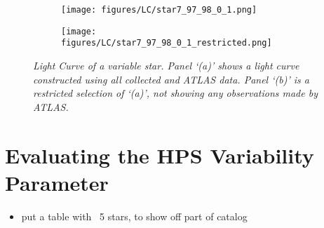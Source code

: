 \documentclass[aps,prb,twocolumn,superscriptaddress]{revtex4-1}
\begin{document}
\begin{figure*}
	\centering
	\begin{subfigure}{.5\textwidth}
	  \centering
	  \texttt{[image: figures/LC/star7\_97\_98\_0\_1.png]}
		\caption{\it \small{ }}
		\label{fig:LC7}
	\end{subfigure}%
	\begin{subfigure}{.5\textwidth}
	  \centering
			\texttt{[image: figures/LC/star7\_97\_98\_0\_1\_restricted.png]}
		\caption{\it \small{ }}
		\label{fig:restrictedLC7}
	\end{subfigure}
	\caption{\it \small{Light Curve of a variable star.  Panel `(a)' shows a light curve constructed using all collected and ATLAS data.  Panel `(b)' is a restricted selection of `(a)', not showing any observations made by ATLAS.}}
	\label{fig:LC}
\end{figure*}




\section{Evaluating the HPS Variability Parameter}
\iffalse
	\begin{itemize}
		\item{} put a table with ~5 stars, to show off part of catalog
	\end{itemize}
\end{document}
